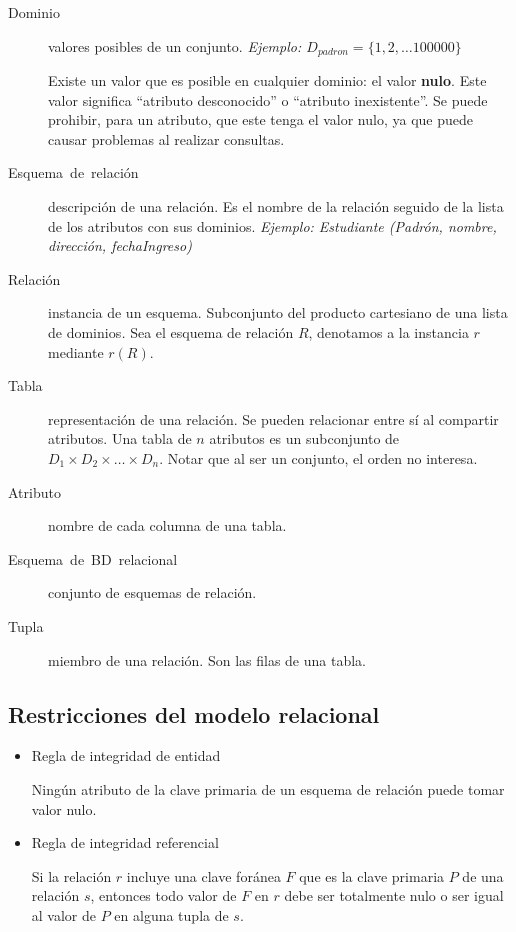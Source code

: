 \documentclass[a4paper, twoside]{article}
\begin{document}
\begin{description}
\item [{Dominio}] valores posibles de un conjunto. \emph{Ejemplo: $D_{padron}=\{1,2,\dots100000\}$}


Existe un valor que es posible en cualquier dominio: el valor \textbf{nulo}.
Este valor significa ``atributo desconocido'' o ``atributo inexistente''.
Se puede prohibir, para un atributo, que este tenga el valor nulo,
ya que puede causar problemas al realizar consultas.

\item [{Esquema~de~relación}] descripción de una relación. Es el nombre
de la relación seguido de la lista de los atributos con sus dominios.
\emph{Ejemplo: Estudiante (Padrón, nombre, dirección, fechaIngreso)}
\item [{Relación}] instancia de un esquema. Subconjunto del producto cartesiano
de una lista de dominios\emph{. }Sea el esquema de relación $R$,
denotamos a la instancia $r$ mediante $r(R)$.
\item [{Tabla}] representación de una relación. Se pueden relacionar entre
sí al compartir atributos. Una tabla de $n$ atributos es un subconjunto
de $D_{1}\times D_{2}\times\dots\times D_{n}$. Notar que al ser un
conjunto, el orden no interesa. 
\item [{Atributo}] nombre de cada columna de una tabla.
\item [{Esquema~de~BD~relacional}] conjunto de esquemas de relación.
\item [{Tupla}] miembro de una relación. Son las filas de una tabla.
\end{description}

\subsection{Restricciones del modelo relacional}
\begin{itemize}
\item Regla de integridad de entidad


Ningún atributo de la clave primaria de un esquema de relación puede
tomar valor nulo.

\item Regla de integridad referencial


Si la relación $r$ incluye una clave foránea $F$ que es la clave
primaria $P$ de una relación $s$, entonces todo valor de $F$ en
$r$ debe ser totalmente nulo o ser igual al valor de $P$ en alguna
tupla de $s$.

\end{itemize}
\end{document}

